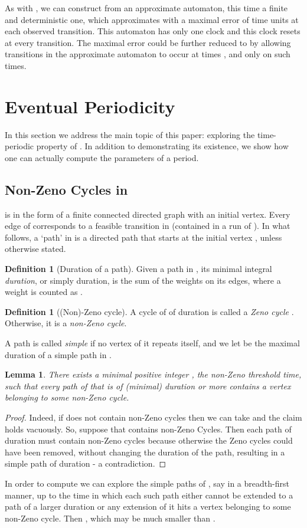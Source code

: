 \documentclass[11pt]{amsart}
\newtheorem{lemma}[theorem]{Lemma}
\theoremstyle{definition}
\newtheorem{definition}[theorem]{Definition}
\begin{document}
As with , we can construct from  an approximate automaton, this time a finite and deterministic one, which approximates  with a maximal error of  time units at each observed transition.
This automaton has only one clock and this clock resets at every transition.
The maximal error  could be further reduced to  by allowing transitions in the approximate automaton to occur at times ,  and only on such times.

\section{Eventual Periodicity}
\label{sec:per}
In this section we address the main topic of this paper: exploring the time-periodic property of .
In addition to demonstrating its existence, we show how one can actually compute the parameters of a period.
\subsection{Non-Zeno Cycles in }
 is in the form of a finite connected directed graph with an initial vertex.
Every edge of  corresponds to a feasible transition in  (contained in a run of ).
In what follows, a `path' in  is a directed path that starts at the initial vertex , unless otherwise stated.
\begin{definition}[Duration of a path]
Given a path  in , its minimal integral \emph{duration}, or simply duration,  is the sum of the weights on its edges, where a weight  is counted as .
\end{definition}
\begin{definition}[(Non)-Zeno cycle]
A  cycle of  of duration  is called a \emph{Zeno cycle} .
Otherwise, it is a \emph{non-Zeno cycle}.
\end{definition}
A path is called \emph{simple} if no vertex of it repeats itself, and we let  be the maximal duration of a simple path in .
\begin{lemma}
\label{lem:reg_time}
There exists a minimal positive integer , the non-Zeno threshold time, such that every path  of  that is of (minimal) duration  or more contains a vertex belonging to some non-Zeno cycle.
\end{lemma}
\begin{proof}
Indeed, if  does not contain non-Zeno cycles then we can take  and the claim holds vacuously.
So, suppose that  contains non-Zeno Cycles.
Then each path of duration  must contain non-Zeno cycles because otherwise the Zeno cycles could have been removed, without changing the duration of the path, resulting in a simple path of duration  - a contradiction.
\end{proof}
In order to compute  we can explore the simple paths of , say in a breadth-first manner, up to the time  in which each such path either cannot be extended to a path of a larger duration or any extension of it hits a vertex belonging to some non-Zeno cycle.
Then , which may be much smaller than .
\end{document}
